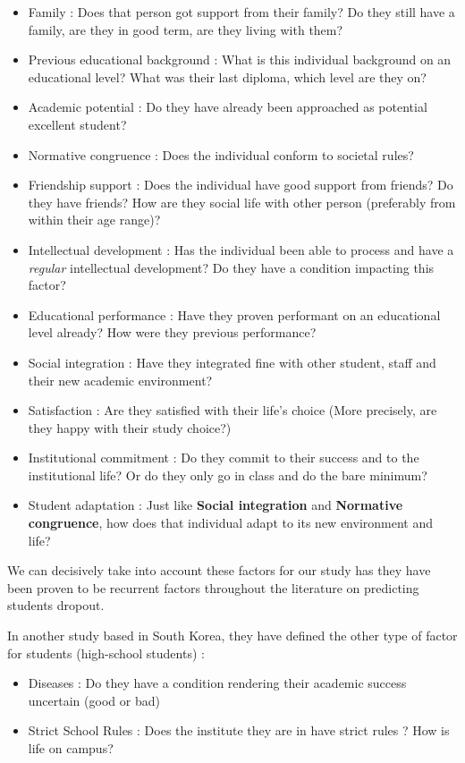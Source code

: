 \documentclass[../../main.tex]{subfiles}
\begin{document}
\begin{itemize}
    \item Family : Does that person got support from their family? Do they still have a family, are they in good term, are they living with them?
    \item Previous educational background : What is this individual background on an educational level? What was their last diploma, which level are they on? 
    \item Academic potential : Do they have already been approached as potential excellent student?
    \item Normative congruence : Does the individual conform to societal rules? 
    \item Friendship support : Does the individual have good support from friends? Do they have friends? How are they social life with other person (preferably from within their age range)?
    \item Intellectual development : Has the individual been able to process and have a \textit{regular} intellectual development? Do they have a condition impacting this factor? 
    \item Educational performance : Have they proven performant on an educational level already? How were they previous performance?
    \item Social integration : Have they integrated fine with other student, staff and their new academic environment?
    \item Satisfaction : Are they satisfied with their life's choice (More precisely, are they happy with their study choice?)
    \item Institutional commitment : Do they commit to their success and to the institutional life? Or do they only go in class and do the bare minimum?
    \item Student adaptation : Just like \textbf{Social integration} and \textbf{Normative congruence}, how does that individual adapt to its new environment and life?
\end{itemize}
We can decisively take into account these factors for our study has they have been proven to be recurrent factors throughout the literature on predicting students dropout.

In another study based in South Korea, they have defined the other type of factor for students (high-school students) \cite{lee_machine_2019} :
\begin{itemize}
    \item Diseases : Do they have a condition rendering their academic success uncertain (good or bad)
    \item Strict School Rules : Does the institute they are in have strict rules ? How is life on campus?
\end{itemize}
\end{document}
